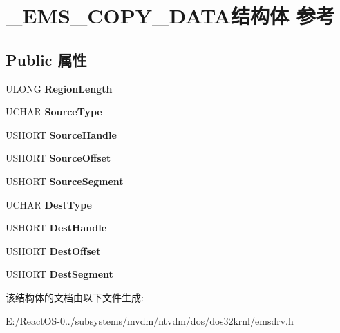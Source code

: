 \hypertarget{struct___e_m_s___c_o_p_y___d_a_t_a}{}\section{\+\_\+\+E\+M\+S\+\_\+\+C\+O\+P\+Y\+\_\+\+D\+A\+T\+A结构体 参考}
\label{struct___e_m_s___c_o_p_y___d_a_t_a}
\subsection*{Public 属性}
\begin{DoxyCompactItemize}
\item 
\mbox{\label{struct___e_m_s___c_o_p_y___d_a_t_a_acd2ac292cc02b8a6d95e90348a1734a0}} 
U\+L\+O\+NG {\bfseries Region\+Length}
\item 
\mbox{\label{struct___e_m_s___c_o_p_y___d_a_t_a_ab0b314ef41bb438d7e408ad70c429db0}} 
U\+C\+H\+AR {\bfseries Source\+Type}
\item 
\mbox{\label{struct___e_m_s___c_o_p_y___d_a_t_a_a2367e9bc25f55b5c4b9b767adcfc9beb}} 
U\+S\+H\+O\+RT {\bfseries Source\+Handle}
\item 
\mbox{\label{struct___e_m_s___c_o_p_y___d_a_t_a_a08aa9436654bae0114218059196237df}} 
U\+S\+H\+O\+RT {\bfseries Source\+Offset}
\item 
\mbox{\label{struct___e_m_s___c_o_p_y___d_a_t_a_a95dff95e1d53bd7bf700db75af6bd40f}} 
U\+S\+H\+O\+RT {\bfseries Source\+Segment}
\item 
\mbox{\label{struct___e_m_s___c_o_p_y___d_a_t_a_ac6e34c50999f6bfe875ce8691c543091}} 
U\+C\+H\+AR {\bfseries Dest\+Type}
\item 
\mbox{\label{struct___e_m_s___c_o_p_y___d_a_t_a_a98d68d1b9004ac4513807fe97494d5e5}} 
U\+S\+H\+O\+RT {\bfseries Dest\+Handle}
\item 
\mbox{\label{struct___e_m_s___c_o_p_y___d_a_t_a_aa22e673e1e210662002f1de0606e4e6c}} 
U\+S\+H\+O\+RT {\bfseries Dest\+Offset}
\item 
\mbox{\label{struct___e_m_s___c_o_p_y___d_a_t_a_a357562894b5adb25fcb0df989a5783e8}} 
U\+S\+H\+O\+RT {\bfseries Dest\+Segment}
\end{DoxyCompactItemize}


该结构体的文档由以下文件生成\+:\begin{DoxyCompactItemize}
\item 
E\+:/\+React\+O\+S-\/0../subsystems/mvdm/ntvdm/dos/dos32krnl/emsdrv.\+h\end{DoxyCompactItemize}
